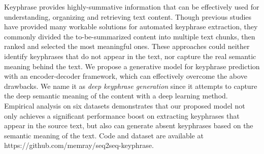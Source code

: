 Keyphrase provides highly-summative information that can be effectively used for understanding, organizing and retrieving text content. Though previous studies have provided many workable solutions for automated keyphrase extraction, they commonly divided the to-be-summarized content into multiple text chunks, then ranked and selected the most meaningful ones. These approaches could neither identify keyphrases that do not appear in the text, nor capture the real semantic meaning behind the text. We propose a generative model for keyphrase prediction with an encoder-decoder framework, which can effectively overcome the above drawbacks.  We name it as \textit{deep keyphrase generation} since it attempts to capture the deep semantic meaning of the content with a deep learning method. Empirical analysis on six datasets demonstrates that our proposed model not only achieves a significant performance boost on extracting keyphrases that appear in the source text, but also can generate absent keyphrases based on the semantic meaning of the text. Code and dataset are available at https://github.com/memray/seq2seq-keyphrase.
